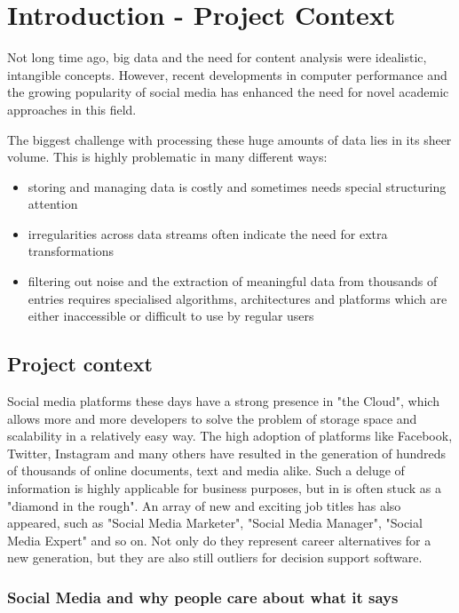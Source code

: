 \chapter{Introduction - Project Context}
\pagestyle{headings}

Not long time ago, big data and the need for content analysis were idealistic, intangible concepts. However, recent developments in computer performance and the growing popularity of social media has enhanced the need for novel academic approaches in this field.

The biggest challenge with processing these huge amounts of data lies in its sheer volume. This is highly problematic in many different ways:

\begin{itemize}
 \item storing and managing data is costly and sometimes needs special structuring attention
\item irregularities across data streams often indicate the need for extra transformations
\item filtering out noise and the extraction of meaningful data from thousands of entries requires specialised algorithms, architectures and platforms which are either inaccessible or difficult to use by regular users
\end{itemize}

\section{Project context}

Social media platforms these days have a strong presence in "the Cloud", which allows more and more developers to solve the problem of storage space and scalability in a relatively easy way. The high adoption of platforms like Facebook, Twitter, Instagram and many others have resulted in the generation of hundreds of thousands of online documents, text and media alike. Such a deluge of information is highly applicable for business purposes, but in is often stuck as a "diamond in the rough". An array of new and exciting job titles has also appeared, such as "Social Media Marketer", "Social Media Manager", "Social Media Expert" and so on. Not only do they represent career alternatives for a new generation, but they are also still outliers for decision support software.

\subsection{Social Media and why people care about what it says}

